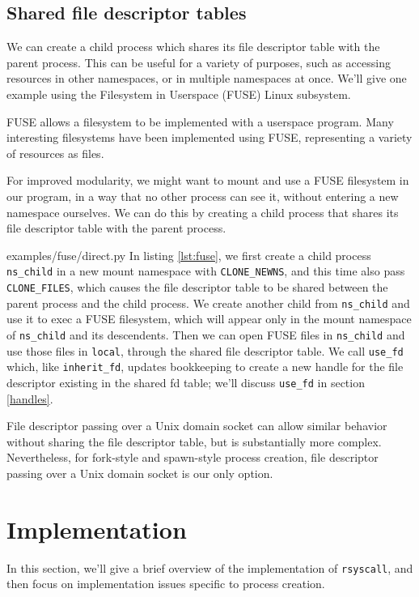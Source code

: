 \documentclass[letterpaper,twocolumn,10pt]{article}
\begin{document}
\subsection{Shared file descriptor tables}\label{shared_fd_table}
We can create a child process which shares its file descriptor table with the parent process.
This can be useful for a variety of purposes,
such as accessing resources in other namespaces, or in multiple namespaces at once.
We'll give one example using the Filesystem in Userspace (FUSE) Linux subsystem.

FUSE allows a filesystem to be implemented with a userspace program.\cite{fuse}
Many interesting filesystems have been implemented using FUSE,
representing a variety of resources as files.\cite{sshfs}\cite{encfs}\cite{mp3fs}

For improved modularity, we might want to mount and use a FUSE filesystem in our program,
in a way that no other process can see it,
without entering a new namespace ourselves.
We can do this by creating a child process that shares its file descriptor table with the parent process.


{examples/fuse/direct.py}
In listing \ref{lst:fuse},
we first create a child process \verb|ns_child| in a new mount namespace with \verb|CLONE_NEWNS|,
and this time also pass \verb|CLONE_FILES|,
which causes the file descriptor table to be shared between the parent process and the child process.\cite{clone}
We create another child from \verb|ns_child|
and use it to exec a FUSE filesystem,
which will appear only in the mount namespace of \verb|ns_child| and its descendents.
Then we can open FUSE files in \verb|ns_child|
and use those files in \texttt{local},
through the shared file descriptor table.
We call \texttt{use\_fd} which, like \texttt{inherit\_fd},
updates bookkeeping to create a new handle for the file descriptor existing in the shared fd table;
we'll discuss \texttt{use\_fd} in section \ref{handles}.

File descriptor passing over a Unix domain socket
can allow similar behavior without sharing the file descriptor table,
but is substantially more complex.\cite{scm_rights}
Nevertheless, for fork-style and spawn-style process creation,
file descriptor passing over a Unix domain socket
is our only option.
\section{Implementation}\label{implementation}
In this section, we'll give a brief overview of the implementation of \texttt{rsyscall},
and then focus on implementation issues specific to process creation.
\end{document}
